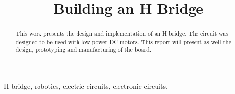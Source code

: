 \documentclass[journal]{IEEEtran}
\begin{document}
    \title{Building an H Bridge}
    
    \author{
        }
    
    \maketitle
    
    \begin{abstract}
        
        This work presents the design and implementation of an H bridge. The circuit was designed to be used with low power DC motors. This report will present as well the design, prototyping and manufacturing of the board.
                
    \end{abstract}
    
    \begin{IEEEkeywords}
        H bridge, robotics, electric circuits, electronic circuits.        
    \end{IEEEkeywords}
    
 
    
    
    
    
    
    
    
    
    
    
    
    
\end{document}
